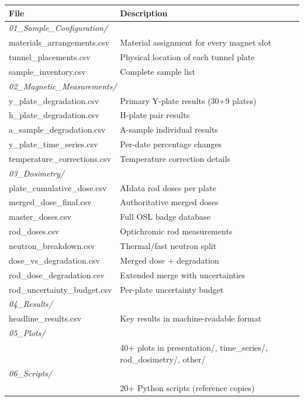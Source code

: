 \documentclass[11pt,letterpaper]{article}
\begin{document}
\begin{appendices}
\begin{longtable}{@{}p{6cm}p{8cm}@{}}
\toprule
\textbf{File} & \textbf{Description} \\
\midrule
\endhead
\multicolumn{2}{l}{\textit{01\_Sample\_Configuration/}} \\
\quad materials\_arrangements.csv & Material assignment for every magnet slot \\
\quad tunnel\_placements.csv & Physical location of each tunnel plate \\
\quad sample\_inventory.csv & Complete sample list \\
\midrule
\multicolumn{2}{l}{\textit{02\_Magnetic\_Measurements/}} \\
\quad y\_plate\_degradation.csv & Primary Y-plate results (30+9 plates) \\
\quad h\_plate\_degradation.csv & H-plate pair results \\
\quad a\_sample\_degradation.csv & A-sample individual results \\
\quad y\_plate\_time\_series.csv & Per-date percentage changes \\
\quad temperature\_corrections.csv & Temperature correction details \\
\midrule
\multicolumn{2}{l}{\textit{03\_Dosimetry/}} \\
\quad plate\_cumulative\_dose.csv & AIdata rod doses per plate \\
\quad merged\_dose\_final.csv & Authoritative merged doses \\
\quad master\_doses.csv & Full OSL badge database \\
\quad rod\_doses.csv & Optichromic rod measurements \\
\quad neutron\_breakdown.csv & Thermal/fast neutron split \\
\quad dose\_vs\_degradation.csv & Merged dose + degradation \\
\quad rod\_dose\_degradation.csv & Extended merge with uncertainties \\
\quad rod\_uncertainty\_budget.csv & Per-plate uncertainty budget \\
\midrule
\multicolumn{2}{l}{\textit{04\_Results/}} \\
\quad headline\_results.csv & Key results in machine-readable format \\
\midrule
\multicolumn{2}{l}{\textit{05\_Plots/}} \\
\quad & 40+ plots in presentation/, time\_series/, rod\_dosimetry/, other/ \\
\midrule
\multicolumn{2}{l}{\textit{06\_Scripts/}} \\
\quad & 20+ Python scripts (reference copies) \\
\bottomrule
\end{longtable}

\end{appendices}

\printbibliography
\end{document}
